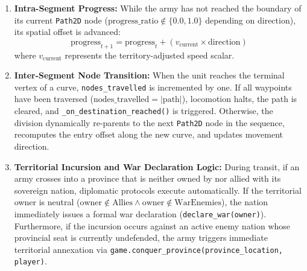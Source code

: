 \begin{enumerate}
    \item \textbf{Intra-Segment Progress:} While the army has not reached the boundary of its current \texttt{Path2D} node ($\text{progress\_ratio} \notin \{0.0, 1.0\}$ depending on direction), its spatial offset is advanced:
    \begin{equation}
        \text{progress}_{t+1} = \text{progress}_t + (v_{\text{current}} \times \text{direction})
    \end{equation}
    where $v_{\text{current}}$ represents the territory-adjusted speed scalar.
    \item \textbf{Inter-Segment Node Transition:} When the unit reaches the terminal vertex of a curve, \texttt{nodes\_travelled} is incremented by one. If all waypoints have been traversed ($\text{nodes\_travelled} = |\text{path}|$), locomotion halts, the path is cleared, and \texttt{\_on\_destination\_reached()} is triggered. Otherwise, the division dynamically re-parents to the next \texttt{Path2D} node in the sequence, recomputes the entry offset along the new curve, and updates movement direction.
    \item \textbf{Territorial Incursion and War Declaration Logic:} During transit, if an army crosses into a province that is neither owned by nor allied with its sovereign nation, diplomatic protocols execute automatically. If the territorial owner is neutral ($\text{owner} \notin \text{Allies} \land \text{owner} \notin \text{WarEnemies}$), the nation immediately issues a formal war declaration (\texttt{declare\_war(owner)}). Furthermore, if the incursion occurs against an active enemy nation whose provincial seat is currently undefended, the army triggers immediate territorial annexation via \texttt{game.conquer\_province(province\_location, player)}.
\end{enumerate}

